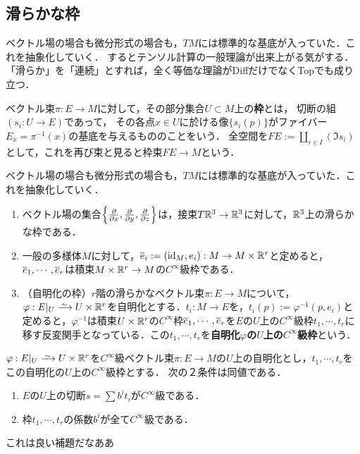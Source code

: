 \documentclass[uplatex,dvipdfmx]{jsreport}
\begin{document}
\subsection{滑らかな枠}

\begin{tcolorbox}[colframe=ForestGreen, colback=ForestGreen!10!white,breakable,colbacktitle=ForestGreen!40!white,coltitle=black,fonttitle=\bfseries\sffamily,
title=]
    ベクトル場の場合も微分形式の場合も，$TM$には標準的な基底が入っていた．これを抽象化していく．
    するとテンソル計算の一般理論が出来上がる気がする．
    「滑らか」を「連続」とすれば，全く等価な理論がDiffだけでなくTopでも成り立つ．
\end{tcolorbox}

\begin{definition}[frame]
    ベクトル束$\pi:E\to M$に対して，その部分集合$U\subset M$上の\textbf{枠}とは，
    切断の組$(s_i:U\to E)$であって，
    その各点$x\in U$に於ける像$\{s_i(p)\}$がファイバー$E_x=\pi^{-1}(x)$の基底を与えるもののことをいう．
    全空間を$FE:=\coprod_{i\in I}(\Im s_i)$として，これを再び束と見ると枠束$FE\to M$という．
\end{definition}
\begin{example}
    ベクトル場の場合も微分形式の場合も，$TM$には標準的な基底が入っていた．これを抽象化していく．
    \begin{enumerate}
        \item ベクトル場の集合$\left\{\frac{\partial }{\partial x},\frac{\partial }{\partial y},\frac{\partial }{\partial z}\right\}$は，接束$T\mathbb{R}^3\to\mathbb{R}^3$に対して，$\mathbb{R}^3$上の滑らかな枠である．
        \item 一般の多様体$M$に対して，$\overline{e}_i:=(\mathrm{id}_M,e_i):M\to M\times\mathbb{R}^r$と定めると，$\overline{e}_1,\cdots,\overline{e}_r$は積束$M\times\mathbb{R}^r\to M$の$C^\infty$級枠である．
        \item （自明化の枠）$r$階の滑らかなベクトル束$\pi:E\to M$について，$\varphi:E|_U\iso U\times\R^r$を自明化とする．$t_i:M\to E$を，$t_i(p):=\varphi^{-1}(p,e_i)$と定めると，$\varphi^{-1}$は積束$U\times\mathbb{R}^r$の$C^\infty$枠$\overline{e}_1,\cdots,\overline{e}_r$を$E$の$U$上の$C^\infty$級枠$t_1,\cdots,t_r$に移す反変関手となっている．この$t_1,\cdots,t_r$を\textbf{自明化$\varphi$の$U$上の$C^\infty$級枠}という．
    \end{enumerate}
\end{example}

\begin{lemma}
    $\varphi:E|_U\iso U\times\R^r$を$C^\infty$級ベクトル束$\pi:E\to M$の$U$上の自明化とし，$t_1,\cdots,t_r$をこの自明化の$U$上の$C^\infty$級枠とする．
    次の２条件は同値である．
    \begin{enumerate}
        \item $E$の$U$上の切断$s=\sum b^it_i$が$C^\infty$級である．
        \item 枠$t_1,\cdots,t_r$の係数$b^i$が全て$C^\infty$級である．
    \end{enumerate}
\end{lemma}
\begin{remarks}
    これは良い補題だなああ
\end{remarks}
\end{document}

